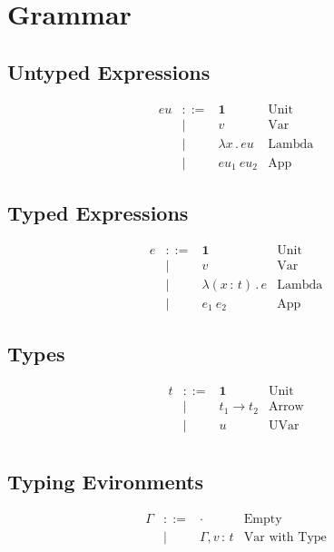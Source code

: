 \documentclass{article}
\newcommand{\define}{::=}
\newcommand{\G}{\Gamma}
\newcommand{\unit}{\mathbf{1}}
\newcommand{\tp}{t}
\newcommand{\uv}{u}
\newcommand{\eu}{eu}
\newcommand{\e}{e}
\newcommand{\x}{x}
\newcommand{\var}{v}
\newcommand{\nil}{\cdot}
\newcommand{\withtp}[2]{{#1} \,:\, {#2}}
\newcommand{\app}[2]{{#1}\ {#2}}
\newcommand{\lam}[2]{\lambda {#1} \,.\, {#2}}
\newcommand{\lamtp}[3]{\lambda \left( {\withtp {#1} {#2}} \right) \,.\, {#3}}
\newcommand{\arr}[2]{{#1} \to {#2}}
\begin{document}
\section{Grammar}

\subsection{Untyped Expressions}
\[
  \begin{array}{rcll}
    \eu & \define & \unit & \text{Unit} \\
        & \mid    & \var  & \text{Var}  \\
        & \mid    & \lam \x \eu & \text{Lambda} \\
        & \mid    & \app {\eu_1} {\eu_2} & \text{App}
  \end{array}
\]

\subsection{Typed Expressions}
\[
  \begin{array}{rcll}
    \e  & \define & \unit & \text{Unit} \\
        & \mid    & \var  & \text{Var}  \\
        & \mid    & \lamtp \x \tp \e & \text{Lambda} \\
        & \mid    & \app {\e_1} {\e_2} & \text{App}
  \end{array}
\]

\subsection{Types}
\[
  \begin{array}{rcll}
    \tp & \define & \unit & \text{Unit} \\
        & \mid    & \arr {\tp_1} {\tp_2}    & \text{Arrow}  \\
        & \mid    & \uv & \text{UVar} \\
  \end{array}
\]

\subsection{Typing Evironments}
\[
  \begin{array}{rcll}
    \G  & \define & \nil & \text{Empty} \\
        & \mid    & \G , {\withtp \var \tp} & \text{Var with Type}  \\
  \end{array}
\]
\end{document}
